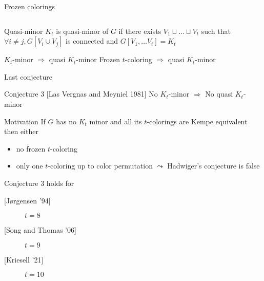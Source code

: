 \documentclass[11pt,xcolor=dvipsnames,presentation,aspectratio=169]{beamer}
\begin{document}
\begin{frame}{Frozen colorings}
\begin{columns}
\begin{column}{.45\textwidth}
    \end{column}
  \end{columns}

  
  \begin{exampleblock}{Quasi-minor}
    $K_t$ is quasi-minor of $G$ if there exists $V_1 \sqcup \dots \sqcup V_t$ such
    that $\forall i \neq j, G[V_i \cup V_j]$ is connected and $G[V_1, \dots V_t]
    = K_t$
  \end{exampleblock}
  
  $K_t$-minor $\Rightarrow$ quasi $K_t$-minor \hspace{3cm}
  Frozen $t$-coloring $\Rightarrow$ quasi $K_t$-minor 
\end{frame}

\begin{frame}{Last conjecture}
  \begin{alertblock}{Conjecture 3 [Las Vergnas and Meyniel 1981]}
    No $K_t$-minor $\Rightarrow$ No quasi $K_t$-minor
  \end{alertblock}
  \begin{block}{Motivation}
    If $G$ has no $K_t$ minor and all its $t$-colorings are Kempe equivalent
    then either 
    \begin{itemize}
    \item no frozen $t$-coloring
    \item only one $t$-coloring up to color permutation $\leadsto$ Hadwiger's
      conjecture is false
    \end{itemize}
  \end{block}

  \begin{block}{Conjecture 3 holds for}
    \begin{description}
    \item[{[Jørgensen '94]}] $t= 8$
    \item[{[Song and Thomas '06]}] $t=9$
    \item[{[Kriesell '21]}] $t=10$
    \end{description}
  \end{block}
  
\end{frame}
\end{document}
